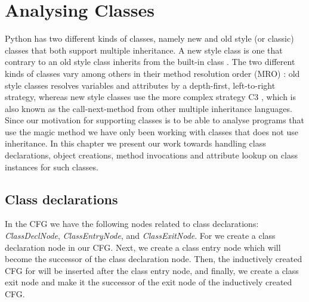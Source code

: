 \chapter{Analysing Classes}
Python has two different kinds of classes, namely new and old style (or classic) classes that both support multiple inheritance. A new style class is one that contrary to an old style class inherits from the built-in class . The two different kinds of classes vary among others in their method resolution order (MRO) \cite{pyref.typehierarchy}: old style classes resolves variables and attributes by a depth-first, left-to-right strategy, whereas new style classes use the more complex strategy C3 \cite{pyref.c3mro}, which is also known as the call-next-method from other multiple inheritance languages. Since our motivation for supporting classes is to be able to analyse programs that use the magic method  we have only been working with classes that does not use inheritance. In this chapter we present our work towards handling class declarations, object creations, method invocations and attribute lookup on class instances for such classes.





\section{Class declarations}
In the CFG we have the following nodes related to class declarations: \textit{ClassDeclNode}, \textit{ClassEntryNode}, and \textit{ClassExitNode}. For  we create a class declaration node in our CFG. Next, we create a class entry node which will become the successor of the class declaration node. Then, the inductively created CFG for  will be inserted after the class entry node, and finally, we create a class exit node and make it the successor of the exit node of the inductively created  CFG.

